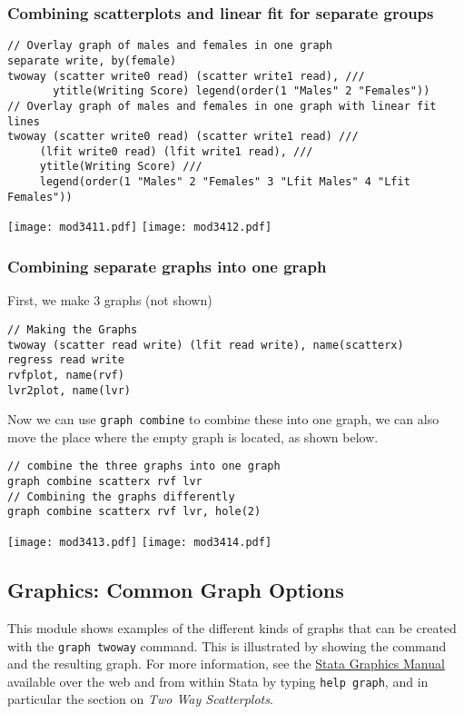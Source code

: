 \subsubsection{Combining scatterplots and linear fit for separate groups}

\begin{lstlisting}
// Overlay graph of males and females in one graph
separate write, by(female)
twoway (scatter write0 read) (scatter write1 read), ///
       ytitle(Writing Score) legend(order(1 "Males" 2 "Females"))
// Overlay graph of males and females in one graph with linear fit lines
twoway (scatter write0 read) (scatter write1 read) ///
     (lfit write0 read) (lfit write1 read), ///
     ytitle(Writing Score) ///
     legend(order(1 "Males" 2 "Females" 3 "Lfit Males" 4 "Lfit Females"))
\end{lstlisting}
\begin{center}
\texttt{[image: mod3411.pdf]}
\texttt{[image: mod3412.pdf]}
\end{center}

\subsubsection{Combining separate graphs into one graph}
First, we make 3 graphs (not shown)
\begin{lstlisting}
// Making the Graphs
twoway (scatter read write) (lfit read write), name(scatterx)
regress read write
rvfplot, name(rvf)
lvr2plot, name(lvr)
\end{lstlisting}

Now we can use \lstinline{graph combine} to combine these into one graph, we can also move the place where the empty graph is located, as shown below.

\begin{lstlisting}
// combine the three graphs into one graph
graph combine scatterx rvf lvr
// Combining the graphs differently
graph combine scatterx rvf lvr, hole(2)
\end{lstlisting}
\begin{center}
\texttt{[image: mod3413.pdf]}
\texttt{[image: mod3414.pdf]}
\end{center}

\subsection{Graphics: Common Graph Options}
This module shows examples of the different kinds of graphs that can be created with the \lstinline{graph twoway} command.  This is illustrated by showing the command and the resulting graph.  For more information, see the \href{http://www.stata.com/help.cgi?graph}{Stata Graphics Manual} available over the web and from within Stata by typing \lstinline{help graph}, and in particular the section on \textit{Two Way Scatterplots}.

